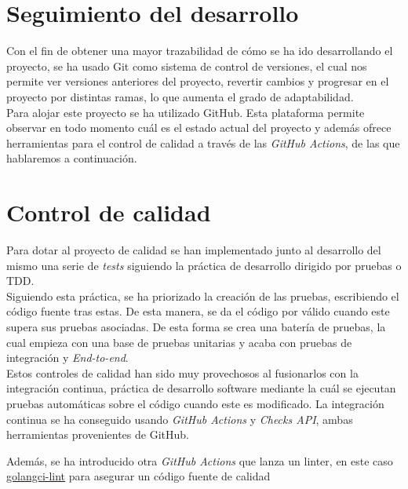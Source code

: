 \section{Seguimiento del desarrollo}

Con el fin de obtener una mayor trazabilidad de cómo se ha ido desarrollando el proyecto, se ha usado Git como sistema de control de versiones, el cual nos permite ver versiones anteriores
del proyecto, revertir cambios y progresar en el proyecto por distintas ramas, lo que aumenta el grado de adaptabilidad.\\

Para alojar este proyecto se ha utilizado GitHub. Esta plataforma permite observar en todo momento cuál es el estado actual del proyecto y además ofrece herramientas para el control de calidad
a través de las \textit{GitHub Actions}, de las que hablaremos a continuación.


\section {Control de calidad}

Para dotar al proyecto de calidad se han implementado junto al desarrollo del mismo una serie de \textit{tests} siguiendo la práctica de desarrollo dirigido por pruebas o TDD.\\

Siguiendo esta práctica, se ha priorizado la creación de las pruebas, escribiendo el código fuente tras estas. De esta manera, se da el código por válido cuando este supera sus pruebas asociadas.
De esta forma se crea una batería de pruebas, la cual empieza con una base de pruebas unitarias y acaba con pruebas de integración y \textit{End-to-end}.\\

Estos controles de calidad han sido muy provechosos al fusionarlos con la integración continua, práctica de desarrollo software mediante la cuál se ejecutan pruebas automáticas sobre el código cuando este es modificado.
La integración continua se ha conseguido usando \textit{GitHub Actions} y \textit{Checks API}, ambas herramientas provenientes de GitHub.

Además, se ha introducido otra \textit{GitHub Actions} que lanza un linter, en este caso \href{https://golangci-lint.run/}{golangci-lint} para asegurar un código fuente de calidad